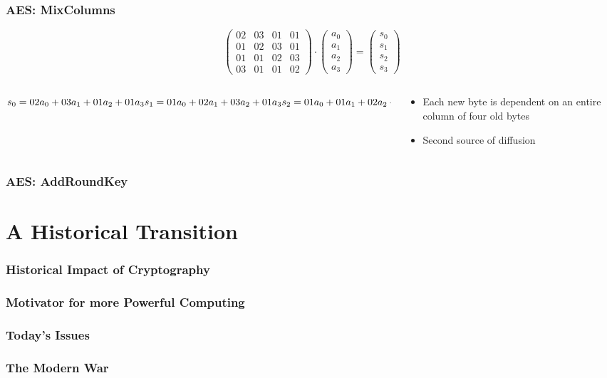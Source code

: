 \documentclass[12pt]{beamer}
\begin{document}
\begin{frame}
\frametitle{AES: MixColumns}

\[ \left( \begin{array}{cccc}
02 & 03 & 01 & 01 \\
01 & 02 & 03 & 01 \\
01 & 01 & 02 & 03 \\
03 & 01 & 01 & 02\end{array} \right)
\cdot
\left( \begin{array}{c}
a_0 \\
a_1 \\
a_2 \\
a_3\end{array} \right)
=
\left( \begin{array}{c}
s_0 \\
s_1 \\
s_2 \\
s_3\end{array} \right)
\]

\begin{columns}
\begin{column}{0.5\textwidth}
\pause
\begin{center}
$
s_0 = {02}a_0+{03}a_1+{01}a_2+{01}a_3 \\[0pt]
s_1 = {01}a_0+{02}a_1+{03}a_2+{01}a_3 \\[0pt]
s_2 = {01}a_0+{01}a_1+{02}a_2+{03}a_3 \\[0pt]
s_3 = {03}a_0+{01}a_1+{01}a_2+{02}a_3 \\[0pt]
$
\end{center}
\end{column}
\begin{column}{0.5\textwidth}
\begin{itemize}
\pause
\item Each new byte is dependent on an entire column of four old bytes \pause
\item Second source of diffusion
\end{itemize}
\end{column}
\end{columns}
\end{frame}


\begin{frame}
\frametitle{AES: AddRoundKey}
\end{frame}

\section{A Historical Transition}

\begin{frame}
\frametitle{Historical Impact of Cryptography}
\end{frame}

\begin{frame}
\frametitle{Motivator for more Powerful Computing}
\end{frame}

\begin{frame}
\frametitle{Today's Issues}
\end{frame}

\begin{frame}
\frametitle{The Modern War}
\end{frame}

 
\end{document}
